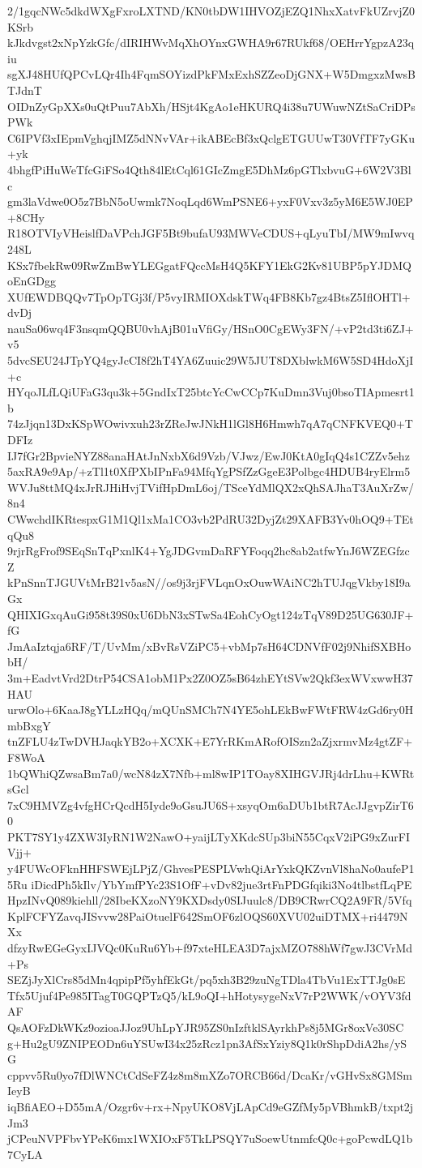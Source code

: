 2/1gqcNWc5dkdWXgFxroLXTND/KN0tbDW1IHVOZjEZQ1NhxXatvFkUZrvjZ0KSrb
kJkdvgst2xNpYzkGfc/dIRIHWvMqXhOYnxGWHA9r67RUkf68/OEHrrYgpzA23qiu
sgXJ48HUfQPCvLQr4Ih4FqmSOYizdPkFMxExhSZZeoDjGNX+W5DmgxzMwsBTJdnT
OIDnZyGpXXs0uQtPuu7AbXh/HSjt4KgAo1eHKURQ4i38u7UWuwNZtSaCriDPsPWk
C6IPVf3xIEpmVghqjIMZ5dNNvVAr+ikABEcBf3xQclgETGUUwT30VfTF7yGKu+yk
4bhgfPiHuWeTfcGiFSo4Qth84lEtCql61GIcZmgE5DhMz6pGTlxbvuG+6W2V3Blc
gm3laVdwe0O5z7BbN5oUwmk7NoqLqd6WmPSNE6+yxF0Vxv3z5yM6E5WJ0EP+8CHy
R18OTVIyVHeislfDaVPchJGF5Bt9bufaU93MWVeCDUS+qLyuTbI/MW9mIwvq248L
KSx7fbekRw09RwZmBwYLEGgatFQccMsH4Q5KFY1EkG2Kv81UBP5pYJDMQoEnGDgg
XUfEWDBQQv7TpOpTGj3f/P5vyIRMIOXdskTWq4FB8Kb7gz4BtsZ5IflOHTl+dvDj
nauSa06wq4F3nsqmQQBU0vhAjB01uVfiGy/HSnO0CgEWy3FN/+vP2td3ti6ZJ+v5
5dvcSEU24JTpYQ4gyJcCI8f2hT4YA6Zuuic29W5JUT8DXblwkM6W5SD4HdoXjI+c
HYqoJLfLQiUFaG3qu3k+5GndIxT25btcYcCwCCp7KuDmn3Vuj0bsoTIApmesrt1b
74zJjqn13DxKSpWOwivxuh23rZReJwJNkH1lGl8H6Hmwh7qA7qCNFKVEQ0+TDFIz
IJ7fGr2BpvieNYZ88anaHAtJnNxbX6d9Vzb/VJwz/EwJ0KtA0gIqQ4s1CZZv5ehz
5axRA9e9Ap/+zTl1t0XfPXbIPnFa94MfqYgPSfZzGgeE3Polbgc4HDUB4ryElrm5
WVJu8ttMQ4xJrRJHiHvjTVifHpDmL6oj/TSceYdMlQX2xQhSAJhaT3AuXrZw/8n4
CWwchdIKRtespxG1M1Ql1xMa1CO3vb2PdRU32DyjZt29XAFB3Yv0hOQ9+TEtqQu8
9rjrRgFrof9SEqSnTqPxnlK4+YgJDGvmDaRFYFoqq2hc8ab2atfwYnJ6WZEGfzcZ
kPnSnnTJGUVtMrB21v5asN//os9j3rjFVLqnOxOuwWAiNC2hTUJqgVkby18I9aGx
QHIXIGxqAuGi958t39S0xU6DbN3xSTwSa4EohCyOgt124zTqV89D25UG630JF+fG
JmAaIztqja6RF/T/UvMm/xBvRsVZiPC5+vbMp7sH64CDNVfF02j9NhifSXBHobH/
3m+EadvtVrd2DtrP54CSA1obM1Px2Z0OZ5sB64zhEYtSVw2Qkf3exWVxwwH37HAU
urwOlo+6KaaJ8gYLLzHQq/mQUnSMCh7N4YE5ohLEkBwFWtFRW4zGd6ry0HmbBxgY
tnZFLU4zTwDVHJaqkYB2o+XCXK+E7YrRKmARofOISzn2aZjxrmvMz4gtZF+F8WoA
1bQWhiQZwsaBm7a0/wcN84zX7Nfb+ml8wIP1TOay8XIHGVJRj4drLhu+KWRtsGcl
7xC9HMVZg4vfgHCrQcdH5Iyde9oGsuJU6S+xsyqOm6aDUb1btR7AcJJgvpZirT60
PKT7SY1y4ZXW3IyRN1W2NawO+yaijLTyXKdcSUp3biN55CqxV2iPG9xZurFIVjj+
y4FUWcOFknHHFSWEjLPjZ/GhvesPESPLVwhQiArYxkQKZvnVl8haNo0aufeP15Ru
iDicdPh5kIlv/YbYmfPYc23S1OfF+vDv82jue3rtFnPDGfqiki3No4tlbstfLqPE
HpzINvQ089kiehll/28IbeKXzoNY9KXDsdy0SIJuulc8/DB9CRwrCQ2A9FR/5Vfq
KplFCFYZavqJISvvw28PaiOtuelF642SmOF6zlOQS60XVU02uiDTMX+ri4479NXx
dfzyRwEGeGyxIJVQc0KuRu6Yb+f97xteHLEA3D7ajxMZO788hWf7gwJ3CVrMd+Ps
SEZjJyXlCrs85dMn4qpipPf5yhfEkGt/pq5xh3B29zuNgTDla4TbVu1ExTTJg0sE
Tfx5Ujuf4Pe985ITagT0GQPTzQ5/kL9oQI+hHotysygeNxV7rP2WWK/vOYV3fdAF
QsAOFzDkWKz9ozioaJJoz9UhLpYJR95ZS0nIzftklSAyrkhPs8j5MGr8oxVe30SC
g+Hu2gU9ZNIPEODn6uYSUwI34x25zRcz1pn3AfSxYziy8Q1k0rShpDdiA2hs/ySG
cppvv5Ru0yo7fDlWNCtCdSeFZ4z8m8mXZo7ORCB66d/DcaKr/vGHvSx8GMSmIeyB
iqBfiAEO+D55mA/Ozgr6v+rx+NpyUKO8VjLApCd9eGZfMy5pVBhmkB/txpt2jJm3
jCPeuNVPFbvYPeK6mx1WXIOxF5TkLPSQY7uSoewUtnmfcQ0c+goPcwdLQ1b7CyLA
